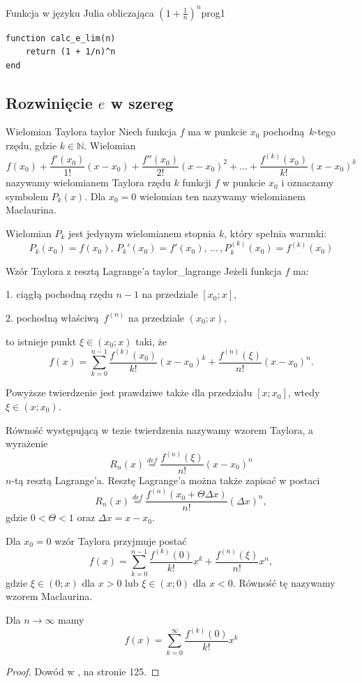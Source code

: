 \documentclass[12pt]{article}
\begin{document}
\begin{prog}{Funkcja w języku Julia obliczająca $(1 + \frac{1}{n})^n$}{prog1}
    \begin{lstlisting}
function calc_e_lim(n)
    return (1 + 1/n)^n
end
    \end{lstlisting}
\end{prog}

\subsection{Rozwinięcie $e$ w szereg}

\begin{defn}{Wielomian Taylora \cite{anmat1}}{taylor}
Niech funkcja $f$ ma w punkcie $x_0$ pochodną $k$-tego rzędu, gdzie $k \in \mathds{N}$.
Wielomian
$$f(x_0) + \frac{f'(x_0)}{1!}(x-x_0) + \frac{f''(x_0)}{2!}(x-x_0)^2 + ... + \frac{f^{(k)}(x_0)}{k!}(x-x_0)^k$$
nazywamy wielomianem Taylora rzędu $k$ funkcji $f$ w punkcie $x_0$ i oznaczamy symbolem
$P_k(x)$. Dla $x_0 = 0$ wielomian ten nazywamy wielomianem Maclaurina.
\newline

Wielomian $P_k$ jest jedynym wielomianem stopnia $k$, który spełnia warunki:
$$P_k(x_0) = f(x_0),\, P_k'(x_0) = f'(x_0),\, ...\,, P_k^{(k)}(x_0) = f^{(k)}(x_0)$$
\end{defn}

\begin{theo}{Wzór Taylora z resztą Lagrange'a \cite{anmat1}}{taylor_lagrange}
    Jeżeli funkcja $f$ ma:
    
    1. ciągłą pochodną rzędu $n - 1$ na przedziale $[x_0; x]$,

    2. pochodną właściwą $f^{(n)}$ na przedziale $(x_0; x)$,

    to istnieje punkt $\xi \in (x_0; x)$ taki, że
    $$f(x) = \sum_{k = 0}^{n - 1}\frac{f^{(k)}(x_0)}{k!}(x-x_0)^k + \frac{f^{(n)}(\xi)}{n!}(x-x_0)^n.$$

    Powyższe twierdzenie jest prawdziwe także dla przedziału $[x; x_0]$, wtedy $\xi\in(x;x_0)$.

    Równość występującą w tezie twierdzenia nazywamy wzorem Taylora, a wyrażenie
    $$R_n(x) \overset{def}{=} \frac{f^{(n)}(\xi)}{n!}(x-x_0)^n$$
    $n$-tą resztą Lagrange'a. Resztę Lagrange'a można także zapisać w postaci
    $$R_n(x) \overset{def}{=} \frac{f^{(n)}(x_0 + \Theta\Delta x)}{n!}(\Delta x)^n,$$
    gdzie $0 < \Theta < 1$ oraz $\Delta x = x - x_0$.

    Dla $x_0 = 0$ wzór Taylora przyjmuje postać
    $$f(x) = \sum_{k = 0}^{n-1}\frac{f^{(k)}(0)}{k!}x^k + \frac{f^{(n)}(\xi)}{n!}x^n,$$
    gdzie $\xi \in (0; x)$ dla $x > 0$ lub $\xi \in (x; 0)$ dla $x < 0$. Równość tę
    nazywamy wzorem Maclaurina.
    \newline
    
    Dla $n \to \infty$ mamy
    $$f(x) = \sum_{k = 0}^{\infty}\frac{f^{(k)}(0)}{k!}x^k$$

    \begin{proof}
        Dowód w \cite{anmat1}, na stronie 125.
    \end{proof}
\end{theo}
\end{document}
